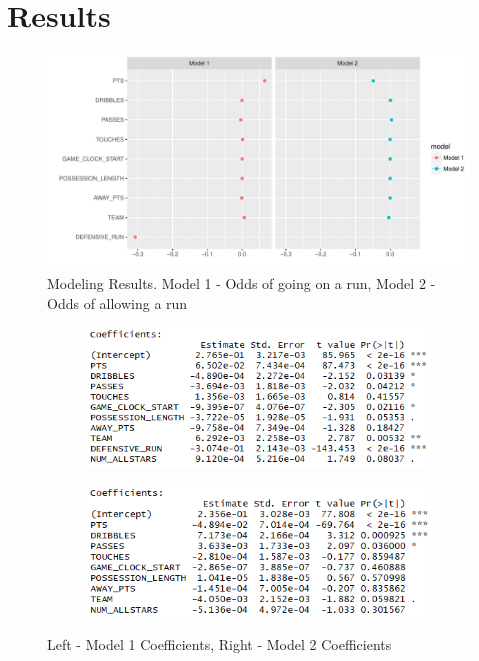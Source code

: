 \documentclass{article}
\begin{document}
\section{Results}

\begin{figure}[h]
\begin{center}
\includegraphics[width=175mm]{results.pdf}
\caption{Modeling Results. Model 1 - Odds of going on a run, Model 2 - Odds of allowing a run}
\end{center}
\end{figure}


\begin{figure}[h]
\centering
\begin{subfigure}{.5\textwidth}
  \centering
  \includegraphics[width=\linewidth]{odds_run_for.png}
  \label{fig:sub1}
\end{subfigure}%
\begin{subfigure}{.5\textwidth}
  \centering
  \includegraphics[width=\linewidth]{odds_run_against.png}
  \label{fig:sub2}
\end{subfigure}
\caption{Left - Model 1 Coefficients, Right - Model 2 Coefficients}
\label{fig:test}
\end{figure}
\end{document}
